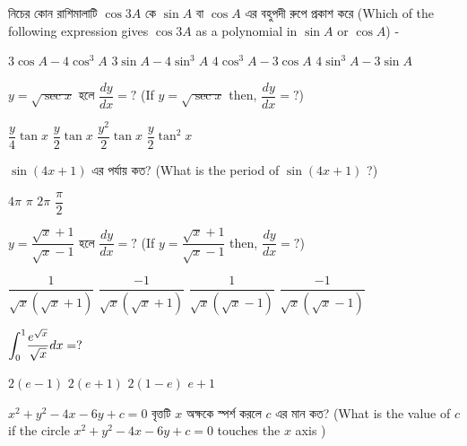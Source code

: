 \documentclass[addpoints]{exam}
\begin{document}
\begin{questions}
\begin{oneparchoices}
\end{oneparchoices}

\question নিচের কোন রাশিমালাটি $ \cos 3A $ কে $ \sin A $ বা $ \cos A $ এর বহুপদী রুপে প্রকাশ করে (Which of the following expression gives  $ \cos 3A $ as a polynomial in $ \sin A $ or $ \cos A $) -

\begin{oneparchoices}
\choice  $ 3\cos A -4\cos^{3} A $
\choice  $ 3\sin A -4\sin^{3} A $
\choice  $ 4\cos^{3} A -3\cos A $
\choice  $ 4\sin^{3} A -3\sin A $
\end{oneparchoices}

\question  $ y=\sqrt{\sec x} $ হলে $ \dfrac{dy}{dx}=?  $ (If $ y=\sqrt{\sec x} $ then, $ \dfrac{dy}{dx}=?  $) 

\begin{oneparchoices}
\choice  $ \dfrac{y}{4}\tan x $
\choice   $ \dfrac{y}{2}\tan x $
\choice   $ \dfrac{y^{2}}{2}\tan x $
\choice   $ \dfrac{y}{2}\tan^{2} x $
\end{oneparchoices}

\question $ \sin (4x+1) $ এর পর্যায় কত? (What is the period of $ \sin (4x+1) $ ?)


\begin{oneparchoices}
\choice $ 4\pi $
\choice $ \pi $
\choice $ 2\pi $
\choice  $ \dfrac{\pi}{2} $
\end{oneparchoices}

 \question  $ y=\dfrac{\sqrt{x}+1}{\sqrt{x}-1} $ হলে $ \dfrac{dy}{dx}=?  $ (If $ y=\dfrac{\sqrt{x}+1}{\sqrt{x}-1} $ then, $ \dfrac{dy}{dx}=?  $) 


\begin{oneparchoices}
\choice $ \dfrac{1}{\sqrt{x}(\sqrt{x}+1)} $
\choice $ \dfrac{-1}{\sqrt{x}(\sqrt{x}+1)} $
\choice $ \dfrac{1}{\sqrt{x}(\sqrt{x}-1)} $
\choice $ \dfrac{-1}{\sqrt{x}(\sqrt{x}-1)} $
\end{oneparchoices}

\question  $ \mathlarger{\int_{0}^{1}}\dfrac{e^{\sqrt{x}}}{\sqrt{x}}dx=? $

\begin{oneparchoices}
\choice  $ 2(e-1) $
\choice  $ 2(e+1) $
\choice  $ 2(1-e) $
\choice  $ e+1 $
\end{oneparchoices}

\question $ x^{2}+y^{2}-4x-6y+c=0 $ বৃত্তটি $ x $ অক্ষকে স্পর্শ করলে $ c $ এর মান কত? (What is the value of $ c $ if the circle $ x^{2}+y^{2}-4x-6y+c=0 $ touches the $ x $ axis )


\end{questions}
\end{document}
